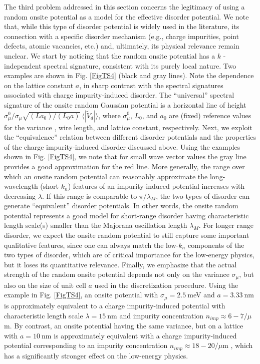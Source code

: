 \documentclass[aps,prmaterials,twocolumn,superscriptaddress,longbibliography]{revtex4-2}
\begin{document}
The third problem addressed in this section concerns the legitimacy of using a random onsite potential as a model for the effective disorder potential. We note that, while this type of disorder potential is widely used in the literature, its connection with a specific disorder mechanism (e.g., charge impurities,  point defects, atomic vacancies, etc.) and, ultimately, its physical relevance remain unclear. We start by noticing that the random onsite potential has a $k$ -independent spectral signature, consistent with its purely local nature. Two examples are shown in Fig. \ref{FigTS4} (black and gray lines). Note the dependence on the lattice constant $a$, in sharp contrast with the spectral signatures associated with charge impurity-induced disorder. The ``universal'' spectral signature of the onsite random Gaussian potential is a horizontal line of height $\sigma_\mu^0/\sigma_\mu\sqrt{(L a_0)/(L_0 a)}~\!\langle|\widetilde{V}_d|\rangle$, where $\sigma_\mu^0$, $L_0$, and $a_0$ are (fixed) reference values for the variance , wire length, and lattice constant, respectively.  
Next, we exploit the ``equivalence'' relation between different disorder potentials and the properties of the charge impurity-induced disorder discussed above. Using the examples shown in Fig. \ref{FigTS4}, we note that for small wave vector values the gray line provides a good approximation for the red line. More generally,  the range over which an onsite random potential can reasonably approximate the long-wavelength (short $k_n$) features of an impurity-induced potential increases with decreasing $\lambda$. If this range is comparable to $\pi/\lambda_M$, the two types of disorder can generate ``equivalent'' disorder potentials. In other words, the onsite random potential represents a good model for short-range disorder having characteristic length scale(s) smaller than the Majorana oscillation length $\lambda_M$. For longer range disorder, we expect the onsite random potential to still capture some important qualitative features, since one can always match the low-$k_n$ components of the two types of disorder, which are of critical importance for the low-energy physics, but it loses its quantitative relevance. Finally, we emphasize that the actual strength of the random onsite potential depends not only on the variance $\sigma_\mu$, but also on the size of unit cell $a$ used in the discretization procedure. Using the example in Fig. \ref{FigTS4}, an onsite potential with $\sigma_\mu=2.5~$meV and $a=3.33~$nm is approximately equivalent to a charge impurity-induced potential with characteristic length scale $\lambda=15~$nm and impurity concentration $n_{imp}\approx 6-7/\mu$m. By contrast, an onsite potential having the same variance, but on a lattice with $a=10~$nm is approximately equivalent with a charge impurity-induced potential corresponding to an impurity concentration $n_{imp}\approx 18-20/\mu$m , which has a significantly stronger effect on the low-energy physics. 
\end{document}
